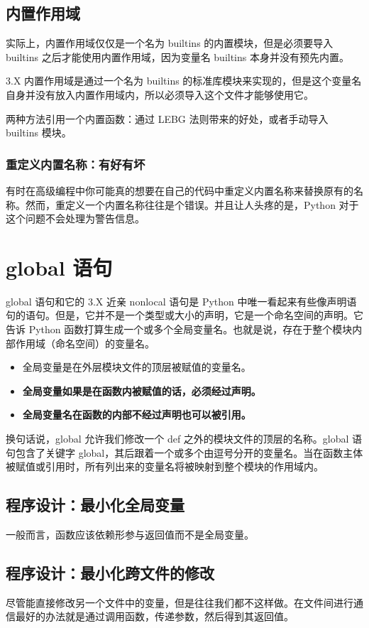 \subsection{内置作用域}
实际上，内置作用域仅仅是一个名为 builtins 的内置模块，但是必须要导入 builtins 之后才能使用内置作用域，因为变量名 builtins 本身并没有预先内置。

3.X 内置作用域是通过一个名为 builtins 的标准库模块来实现的，但是这个变量名自身并没有放入内置作用域内，所以必须导入这个文件才能够使用它。

两种方法引用一个内置函数：通过 LEBG 法则带来的好处，或者手动导入 builtins 模块。
\subsubsection*{重定义内置名称：有好有坏}
有时在高级编程中你可能真的想要在自己的代码中重定义内置名称来替换原有的名称。然而，重定义一个内置名称往往是个错误。并且让人头疼的是，Python 对于这个问题不会处理为警告信息。

\section{global 语句}
global 语句和它的 3.X 近亲 nonlocal 语句是 Python 中唯一看起来有些像声明语句的语句。但是，它并不是一个类型或大小的声明，它是一个命名空间的声明。它告诉 Python 函数打算生成一个或多个全局变量名。也就是说，存在于整个模块内部作用域（命名空间）的变量名。
\begin{itemize}
    \item 全局变量是在外层模块文件的顶层被赋值的变量名。
    \item \textbf{全局变量如果是在函数内被赋值的话，必须经过声明。}
    \item \textbf{全局变量名在函数的内部不经过声明也可以被引用。}
\end{itemize}

换句话说，global 允许我们修改一个 def 之外的模块文件的顶层的名称。global 语句包含了关键字 global，其后跟着一个或多个由逗号分开的变量名。当在函数主体被赋值或引用时，所有列出来的变量名将被映射到整个模块的作用域内。
\subsection{程序设计：最小化全局变量}
一般而言，函数应该依赖形参与返回值而不是全局变量。
\subsection{程序设计：最小化跨文件的修改}
尽管能直接修改另一个文件中的变量，但是往往我们都不这样做。在文件间进行通信最好的办法就是通过调用函数，传递参数，然后得到其返回值。
